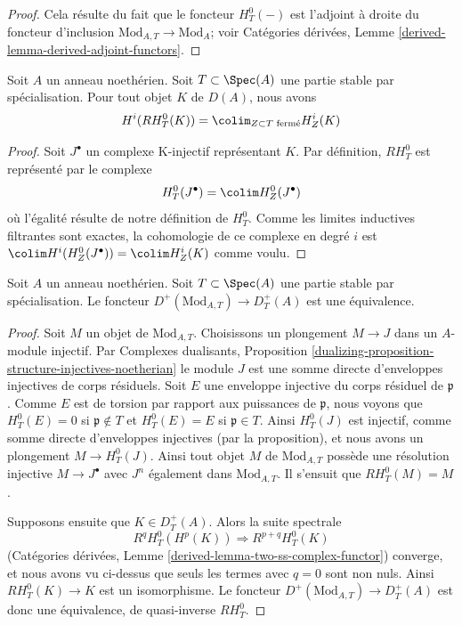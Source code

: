 \begin{proof}
Cela résulte du fait que le foncteur $H^0_T(-)$ est
l'adjoint à droite du foncteur d'inclusion
$\text{Mod}_{A, T} \to \text{Mod}_A$; voir
Catégories dérivées, Lemme \ref{derived-lemma-derived-adjoint-functors}.
\end{proof}

\begin{lemma}
\label{lemma-adjoint-ext}
Soit $A$ un anneau noethérien. Soit $T \subset \Spec(A)$
une partie stable par spécialisation.
Pour tout objet $K$ de $D(A)$, nous avons
$$
H^i(RH^0_T(K)) = \colim_{Z \subset T\text{ fermé}} H^i_Z(K)
$$
\end{lemma}

\begin{proof}
Soit $J^\bullet$ un complexe K-injectif représentant $K$.
Par définition, $RH^0_T$ est représenté par le complexe
$$
H^0_T(J^\bullet) = \colim H^0_Z(J^\bullet)
$$
où l'égalité résulte de notre définition de $H^0_T$.
Comme les limites inductives filtrantes sont exactes, la cohomologie de ce
complexe en degré $i$ est
$\colim H^i(H^0_Z(J^\bullet)) = \colim H^i_Z(K)$
comme voulu.
\end{proof}

\begin{lemma}
\label{lemma-equal-plus}
Soit $A$ un anneau noethérien. Soit $T \subset \Spec(A)$ une partie stable
par spécialisation. Le foncteur $D^+(\text{Mod}_{A, T}) \to D^+_T(A)$
est une équivalence.
\end{lemma}

\begin{proof}
Soit $M$ un objet de $\text{Mod}_{A, T}$. Choisissons un plongement
$M \to J$ dans un $A$-module injectif. Par
Complexes dualisants, Proposition
\ref{dualizing-proposition-structure-injectives-noetherian}
le module $J$ est une somme directe d'enveloppes injectives de corps résiduels.
Soit $E$ une enveloppe injective du corps résiduel de $\mathfrak p$.
Comme $E$ est de torsion par rapport aux puissances de $\mathfrak p$, nous voyons que
$H^0_T(E) = 0$ si $\mathfrak p \not \in T$ et
$H^0_T(E) = E$ si $\mathfrak p \in T$.
Ainsi $H^0_T(J)$ est injectif, comme somme directe d'enveloppes injectives
(par la proposition), et nous avons un plongement $M \to H^0_T(J)$.
Ainsi tout objet $M$ de $\text{Mod}_{A, T}$ possède une résolution injective
$M \to J^\bullet$ avec $J^n$ également dans $\text{Mod}_{A, T}$. Il s'ensuit
que $RH^0_T(M) = M$.

\medskip\noindent
Supposons ensuite que $K \in D_T^+(A)$. Alors la suite spectrale
$$
R^qH^0_T(H^p(K)) \Rightarrow R^{p + q}H^0_T(K)
$$
(Catégories dérivées, Lemme \ref{derived-lemma-two-ss-complex-functor})
converge, et nous avons vu ci-dessus que seuls les termes avec $q = 0$
sont non nuls. Ainsi $RH^0_T(K) \to K$ est un isomorphisme.
Le foncteur $D^+(\text{Mod}_{A, T}) \to D^+_T(A)$
est donc une équivalence, de quasi-inverse $RH^0_T$.
\end{proof}

